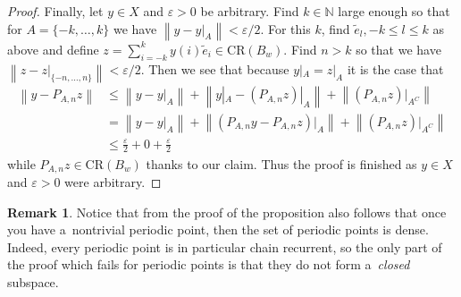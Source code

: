 \documentclass[11pt,a4paper]{amsart}
\theoremstyle{definition}
\newtheorem{remark}[theorem]{Remark}
\newcommand{\N}{\mathbb{N}}
\newcommand{\eps}{\varepsilon}
\newcommand{\norm}[1]{\left\| #1 \right\|}
\newcommand{\CR}{\mathrm{CR}}
\begin{document}
\begin{proof}
		Finally, let $y \in X$ and $\eps > 0$ be arbitrary. Find $k \in \N$ large enough so that for $A = \{-k, \dots, k\}$ we have $\norm{y - y|_A} < \eps/2$. For this $k$, find $\widetilde{e}_l, -k \leq l \leq k$ as above and define $z = \sum_{i=-k}^{k} y(i) \widetilde{e}_i \in \CR(B_w)$. Find $n > k$ so that  we have $\norm{z - z|_{\{-n, \dots, n\}}} < \eps/2$. Then we see that because $y|_A = z|_A$ it is the case that
		\begin{align*}
			\norm{y - P_{A, n}z}
			&\leq \norm{y - y|_A} + \norm{y|_A - (P_{A, n}z)|_A} + \norm{(P_{A, n}z)|_{A^C}}\\
			&= \norm{y - y|_A} + \norm{(P_{A, n}y - P_{A, n}z)|_A} + \norm{(P_{A, n}z)|_{A^C}}\\
			&\leq \frac{\eps}{2} + 0 + \frac{\eps}{2}
		\end{align*}
		while $P_{A, n}z \in \CR(B_w)$ thanks to our claim. Thus the proof is finished as $y \in X$ and $\eps > 0$ were arbitrary.
	\end{proof}
	
	\begin{remark} \label{rem:densePP}
		Notice that from the proof of the proposition also follows that once you have a~nontrivial periodic point, then the set of periodic points is dense. Indeed, every periodic point is in particular chain recurrent, so the only part of the proof which fails for periodic points is that they do not form a~\emph{closed} subspace.
	\end{remark}
	
\end{document}
